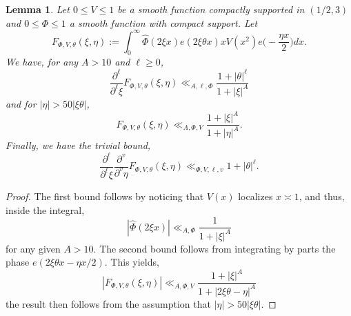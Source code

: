 \documentclass[12pt,reqno]{amsart}
\theoremstyle{plain}
\newtheorem{lemma}{Lemma}
\numberwithin{equation}{section}
\numberwithin{figure}{section}
\theoremstyle{plain}
\theoremstyle{definition}
\theoremstyle{remark}
\begin{document}
\begin{lemma}\label{le: decay bounds} 
  Let $0 \leq V \leq 1$ be a smooth function compactly supported in $(1/2, 3)$ and $0 \leq \Phi \leq 1$ a smooth function with compact support.
  Let
  $$
  F_{\Phi, V, \theta}(\xi, \eta) 
  := \int_{0}^{\infty} 
  \widehat{\Phi}(2 \xi x) 
  e(2 \xi \theta x) x V(x^2) 
  e \Big ( - \frac{\eta x}{2} \Big ) dx.  
  $$
  We have, for any $A > 10$ and $\ell \geq 0$,  
  $$
  \frac{\partial^{\ell}}{\partial^{\ell} \xi} F_{\Phi, V, \theta}(\xi, \eta) \ll_{A, \ell, \Phi} \frac{1 + |\theta|^{\ell}}{1 + |\xi|^{A}}
  $$
  and for $|\eta| > 50 |\xi \theta|$, 
  $$
  F_{\Phi, V, \theta}(\xi, \eta) \ll_{A, \Phi, V} \frac{1 + |\xi|^A}{1 + |\eta|^{A}}.
  $$
  Finally, we have the trivial bound, 
  $$
  \frac{\partial^{\ell}}{\partial^{\ell} \xi} \frac{\partial^v}{\partial^v \eta} F_{\Phi, V, \theta}(\xi, \eta) \ll_{\Phi, V, \ell, v} 1 + |\theta|^{\ell}.
  $$
\end{lemma}
\begin{proof}
The first bound follows by noticing that $V(x)$ localizes $x \asymp 1$, and thus, inside the integral, 
$$
|\widehat{\Phi}(2 \xi x)| \ll_{A, \Phi} \frac{1}{1 + |\xi|^{A}}
$$
for any given $A > 10$. The second bound follows from integrating by parts the phase $e(2 \xi \theta x - \eta x / 2)$. This yields, 
$$
|F_{\Phi, V, \theta}(\xi, \eta)| \ll_{A, \Phi, V} \frac{1 + |\xi|^{A}}{1 + |2 \xi \theta - \eta|^A}
$$
the result then follows from the assumption that $|\eta| > 50 |\xi \theta|$. 
\end{proof}
\end{document}
